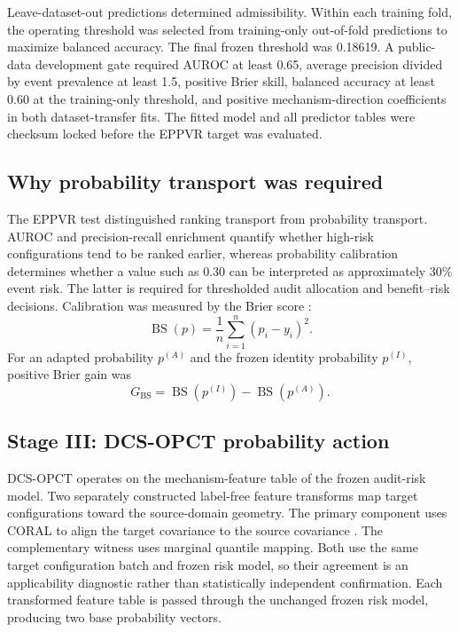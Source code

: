 \documentclass[preprint,12pt]{elsarticle}
\begin{document}
Leave-dataset-out predictions determined admissibility. Within each training fold, the operating threshold was selected from training-only out-of-fold predictions to maximize balanced accuracy. The final frozen threshold was 0.18619. A public-data development gate required AUROC at least 0.65, average precision divided by event prevalence at least 1.5, positive Brier skill, balanced accuracy at least 0.60 at the training-only threshold, and positive mechanism-direction coefficients in both dataset-transfer fits. The fitted model and all predictor tables were checksum locked before the EPPVR target was evaluated.

\subsection{Why probability transport was required}

The EPPVR test distinguished ranking transport from probability transport. AUROC and precision-recall enrichment quantify whether high-risk configurations tend to be ranked earlier, whereas probability calibration determines whether a value such as 0.30 can be interpreted as approximately 30\% event risk. The latter is required for thresholded audit allocation and benefit--risk decisions. Calibration was measured by the Brier score \cite{brier1950verification}:
\begin{equation}
\operatorname{BS}(p)=\frac{1}{n}\sum_{i=1}^{n}(p_i-y_i)^2.
\end{equation}
For an adapted probability $p^{(A)}$ and the frozen identity probability $p^{(I)}$, positive Brier gain was
\begin{equation}
G_{\mathrm{BS}}=\operatorname{BS}(p^{(I)})-\operatorname{BS}(p^{(A)}).
\end{equation}

\subsection{Stage III: DCS-OPCT probability action}
\label{subsec:dcs}

DCS-OPCT operates on the mechanism-feature table of the frozen audit-risk model. Two separately constructed label-free feature transforms map target configurations toward the source-domain geometry. The primary component uses CORAL to align the target covariance to the source covariance \cite{sun2016coral}. The complementary witness uses marginal quantile mapping. Both use the same target configuration batch and frozen risk model, so their agreement is an applicability diagnostic rather than statistically independent confirmation. Each transformed feature table is passed through the unchanged frozen risk model, producing two base probability vectors.
\end{document}
